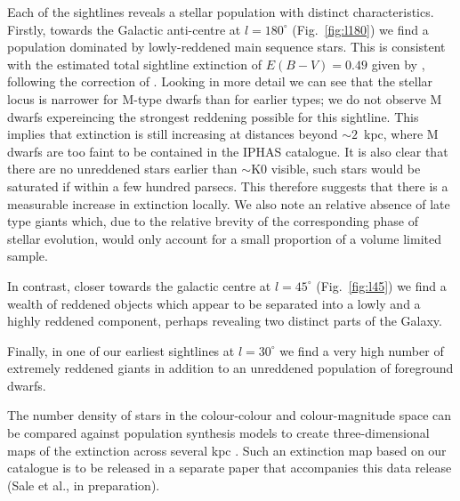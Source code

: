 \documentclass[useAMS,usenatbib]{mn2e}
\begin{document}
Each of the sightlines reveals a stellar population
with distinct characteristics.
Firstly, towards the Galactic anti-centre at $l=180^\circ$ (Fig.~\ref{fig:l180}) 
we find a population dominated by lowly-reddened main sequence stars.
This is consistent with the estimated total sightline extinction of $E(B-V)=0.49$
given by \cite{Schlegel1998}, following the correction of \cite{Schlafly2011}.
Looking in more detail we can see that the stellar locus is narrower for M-type dwarfs than for earlier types;
we do not observe M dwarfs expereincing the strongest reddening possible for this sightline.
This implies that extinction is still increasing at distances beyond $\sim 2$~kpc,
where M dwarfs are too faint to be contained in the IPHAS catalogue.
It is also clear that there are no unreddened stars earlier than $\sim$K0 visible,
such stars would be saturated if within a few hundred parsecs.
This therefore suggests that there is a measurable increase in extinction locally.
We also note an relative absence of late type giants which,
due to the relative brevity of the corresponding phase of stellar evolution,
would only account for a small proportion of a volume limited sample.

 
In contrast, closer towards the galactic
centre at $l=45^\circ$ (Fig.~\ref{fig:l45})
we find a wealth of reddened objects
which appear to be separated into a lowly
and a highly reddened component,
perhaps revealing two distinct parts of the Galaxy.

Finally, in one of our earliest sightlines at $l=30^\circ$
we find a very high number of extremely reddened giants
in addition to an unreddened population
of foreground dwarfs.

The number density of stars in the colour-colour
and colour-magnitude space
can be compared against population synthesis models
to create three-dimensional maps of the extinction
across several kpc \citep{Sale2009,Sale2012}.
Such an extinction map based on our catalogue
is to be released in a separate paper
that accompanies this data release (Sale et al., in preparation).
\end{document}
